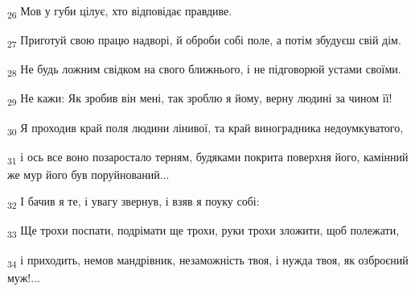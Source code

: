 \begin{tcolorbox}
\textsubscript{26} Мов у губи цілує, хто відповідає правдиве.
\end{tcolorbox}
\begin{tcolorbox}
\textsubscript{27} Приготуй свою працю надворі, й оброби собі поле, а потім збудуєш свій дім.
\end{tcolorbox}
\begin{tcolorbox}
\textsubscript{28} Не будь ложним свідком на свого ближнього, і не підговорюй устами своїми.
\end{tcolorbox}
\begin{tcolorbox}
\textsubscript{29} Не кажи: Як зробив він мені, так зроблю я йому, верну людині за чином її!
\end{tcolorbox}
\begin{tcolorbox}
\textsubscript{30} Я проходив край поля людини лінивої, та край виноградника недоумкуватого,
\end{tcolorbox}
\begin{tcolorbox}
\textsubscript{31} і ось все воно позаростало терням, будяками покрита поверхня його, камінний же мур його був поруйнований...
\end{tcolorbox}
\begin{tcolorbox}
\textsubscript{32} І бачив я те, і увагу звернув, і взяв я поуку собі:
\end{tcolorbox}
\begin{tcolorbox}
\textsubscript{33} Ще трохи поспати, подрімати ще трохи, руки трохи зложити, щоб полежати,
\end{tcolorbox}
\begin{tcolorbox}
\textsubscript{34} і приходить, немов мандрівник, незаможність твоя, і нужда твоя, як озброєний муж!...
\end{tcolorbox}
